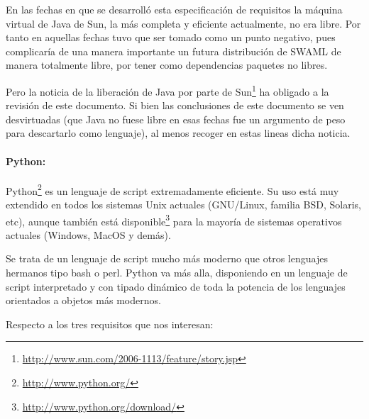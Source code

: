 En las fechas en que se desarrolló esta especificación de requisitos la máquina virtual
de Java de Sun, la más completa y eficiente actualmente, no era libre. Por tanto en 
aquellas fechas tuvo que ser tomado como un punto negativo, pues complicaría de 
una manera importante un futura distribución de SWAML de manera totalmente libre,
por tener como dependencias paquetes no libres.

Pero la noticia de la liberación de Java por parte de Sun\footnote{\url{http://www.sun.com/2006-1113/feature/story.jsp}} ha obligado a la
revisión de este documento. Si bien las conclusiones de este documento se ven 
desvirtuadas (que Java no fuese libre en esas fechas fue un argumento de peso para
descartarlo como lenguaje), al menos recoger en estas lineas dicha noticia.

\paragraph{Python:}Python\footnote{\url{http://www.python.org/}} es un lenguaje de 
script extremadamente eficiente. Su uso está muy extendido en todos los sistemas 
Unix actuales (GNU/Linux, familia BSD, Solaris, etc), aunque también está disponible\footnote{\url{http://www.python.org/download/}} para la mayoría de sistemas 
operativos actuales (Windows, MacOS y demás).

Se trata de un lenguaje de script mucho más moderno que otros lenguajes hermanos 
tipo bash o perl. Python va más alla, disponiendo en un lenguaje de script 
interpretado y con tipado dinámico de toda la potencia de los lenguajes orientados 
a objetos más modernos.

Respecto a los tres requisitos que nos interesan:

